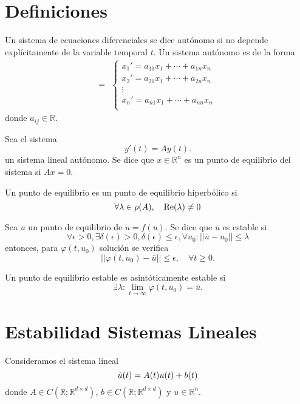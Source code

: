 \section{Definiciones}

\begin{defn}
  Un sistema de ecuaciones diferenciales se dice autónomo si no depende explícitamente de la variable temporal $t$. Un sistema autónomo es de la forma
  \[ 
     =
    \begin{aligned}
      \begin{cases}
        x_{1}' = a_{11} x_{1} + \cdots + a_{1n} x_{n} \\
        x_{2}' = a_{21} x_{1} + \cdots + a_{2n} x_{n} \\
        \vdots \\
        x_{n}' = a_{n1} x_{1} + \cdots + a_{nn} x_{n} \\
      \end{cases}
    \end{aligned} 
  \] 
  donde $a_{ij} \in \mathbb{R}$.
\end{defn}

\begin{defn}
  Sea el sistema 
  \[ 
    y'(t) = A y(t).
  \] 
  un sistema lineal autónomo. Se dice que $x \in \mathbb{R}^{n}$ es un punto de equilibrio del sistema si $A x = 0$.
\end{defn}

\begin{defn}
  Un punto de equilibrio es un punto de equilibrio hiperbólico si 
  \[ 
    \forall \lambda \in \rho(A), \quad \operatorname{Re}(\lambda) \neq 0
  \] 
\end{defn}

\begin{defn}[Estabilidad]
  Sea $\overline{u}$ un punto de equilibrio de $\dot{u} = f(u)$. Se dice que $\overline{u}$ es estable si
  \[
    \forall \epsilon > 0, \exists \delta(\epsilon) > 0, \delta(\epsilon) \leq \epsilon, \forall u_{0} : ||\overline{u} - u_{0} || \leq \lambda
  \]
  entonces, para $\varphi(t, u_{0})$ solución se verifica
  \[
    ||\varphi(t, u_{0}) - \overline{u}|| \leq \epsilon, \quad \forall t \geq 0.
  \]
\end{defn}

\begin{defn}
  Un punto de equilibrio estable es asintóticamente estable si
  \[
    \exists \lambda : \lim_{t \to \infty} \varphi(t, u_{0}) = \overline{u}.
  \]
\end{defn}

\section{Estabilidad Sistemas Lineales}

\begin{note}
  Consideramos el sistema lineal
  \[ 
    \dot{u}(t) = A(t) u(t) + b(t) \\
  \] 
  donde $A \in C(\mathbb{R}; \mathbb{R}^{d \times d})$, $b \in C(\mathbb{R}; \mathbb{R}^{d \times d})$ y $u \in \mathbb{R}^{n}$.
\end{note}
